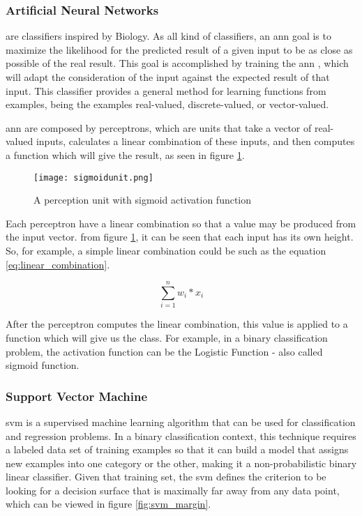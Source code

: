 \subsubsection{Artificial Neural Networks}
\label{subsec:ann}

 are classifiers inspired by Biology. As all kind of classifiers, an \Acrshort{ann} goal is to maximize the likelihood for the predicted result of a given input to be as close as possible of the real result. This goal is accomplished by training the \Acrshort{ann} , which will adapt the consideration of the input against the expected result of that input. This classifier provides a general method for learning functions from examples, being the examples real-valued, discrete-valued, or vector-valued.

\Acrshort{ann} are composed by perceptrons, which are units that take a vector of real-valued inputs, calculates a linear combination of these inputs, and then computes a function which will give the result, as seen in figure \ref{fig:sigmoid_unit}.

\begin{figure}[htpb]
\centering
\texttt{[image: sigmoidunit.png]}
\caption{A perception unit with sigmoid activation function}
\label{fig:sigmoid_unit}
\end{figure}

Each perceptron have a linear combination so that a value may be produced from the input vector. from figure \ref{fig:sigmoid_unit}, it can be seen that each input has its own height. So, for example, a simple linear combination could be such as the equation \ref{eq:linear_combination}.

\begin{equation} 
\label{eq:linear_combination}
\sum_{i=1}^{n} w_{i}*x_{i}
\end{equation}

After the perceptron computes the linear combination, this value is applied to a function which will give us the class. For example, in a binary classification problem, the activation function can be the Logistic Function - also called sigmoid function.

\subsubsection{Support Vector Machine}
\label{subsec:svm}

\Acrfull{svm} is a supervised machine learning algorithm that can be used for classification and regression problems. In a binary classification context, this technique requires a labeled data set of training examples so that it can build a model that assigns new examples into one category or the other, making it a non-probabilistic binary linear classifier.
Given that training set, the \Acrshort{svm} defines the criterion to be looking for a decision surface that is maximally far away from any data point, which can be viewed in figure \ref{fig:svm_margin}. 

